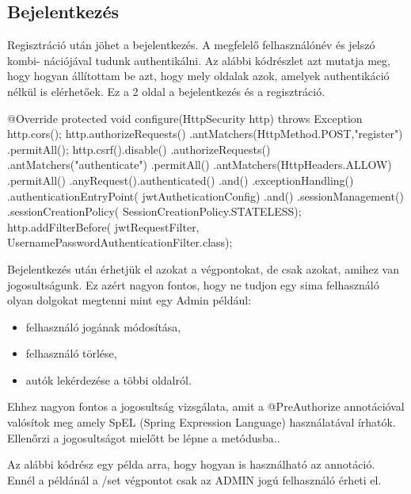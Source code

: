 \subsection{Bejelentkezés}

Regisztráció után jöhet a bejelentkezés. A megfelelő felhasználónév és jelszó kombi-
nációjával tudunk authentikálni. Az alábbi kódrészlet azt mutatja meg, hogy hogyan állítottam be azt, hogy mely oldalak azok, amelyek authentikáció nélkül is elérhetőek. Ez a 2 oldal a bejelentkezés és a regisztráció.

\begin{java}
    @Override
    protected void configure(HttpSecurity http)
     throws Exception {
        http.cors();
        http.authorizeRequests()
        .antMatchers(HttpMethod.POST,"register")
        .permitAll();
        http.csrf().disable()
          .authorizeRequests()
          .antMatchers("authenticate")
          .permitAll()
          .antMatchers(HttpHeaders.ALLOW)
          .permitAll()
          .anyRequest().authenticated()
          .and()
          .exceptionHandling()
          .authenticationEntryPoint(
           jwtAutheticationConfig)
          .and()
          .sessionManagement()
          .sessionCreationPolicy(
          SessionCreationPolicy.STATELESS);
          http.addFilterBefore(
          jwtRequestFilter,
          UsernamePasswordAuthenticationFilter.class);
}
\end{java}

Bejelentkezés után érhetjük el azokat a végpontokat, de csak azokat, amihez van jogosultságunk. Ez azért nagyon fontos, hogy ne tudjon egy sima felhasználó olyan dolgokat megtenni mint egy Admin például:

\begin{itemize}
\item felhasználó jogának módosítása,
\item felhasználó törlése,
\item autók lekérdezése a többi oldalról.
\end{itemize}

Ehhez nagyon fontos a jogosultság vizsgálata, amit a @PreAuthorize annotációval valósítok meg amely SpEL (Spring Expression Language) használatával írhatók. Ellenőrzi a jogosultságot mielőtt be lépne a metódusba.\cite{SpringSecurity}.

Az alábbi kódrész egy példa arra, hogy hogyan is használható az annotáció. Ennél a példánál a /set végpontot csak az ADMIN jogú felhasználó érheti el.

